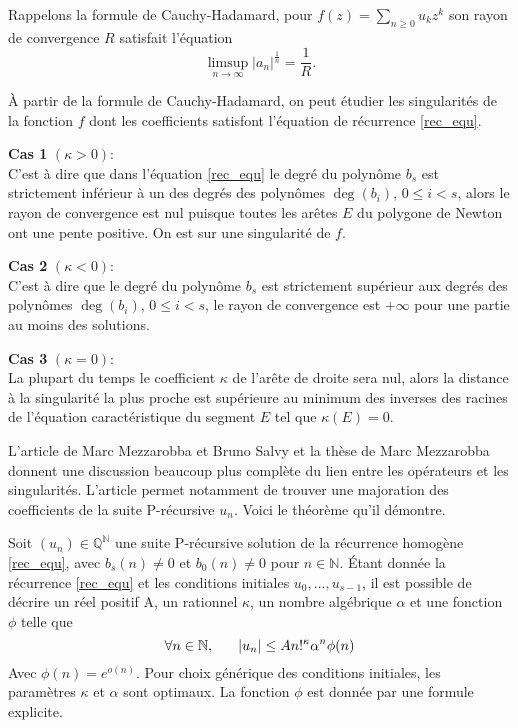 \documentclass[a4paper,10pt]{article}
\begin{document}
	Rappelons la formule de Cauchy-Hadamard, pour $f(z)=\sum_{n\geq0}u_kz^k$ son rayon de convergence $R$ satisfait l'équation
	\begin{equation}
		\limsup_{n\rightarrow \infty}|a_n|^{\frac{1}{n}}=\frac{1}{R}.
		\label{Cauchy_Hadam}
	\end{equation}
	
	À partir de la formule de Cauchy-Hadamard, on peut étudier les singularités de la fonction $f$ dont les coefficients satisfont l'équation de récurrence \eqref{rec_equ}.  
	\vspace{3mm}
	
	\noindent\textbf{Cas 1} $(\kappa>0)$:\\
	C'est à dire que dans l'équation \eqref{rec_equ} le degré du polynôme $b_s$ est strictement inférieur à un des degrés des polynômes $\deg(b_i)$, $0\leq i<s$, alors le rayon de convergence est nul puisque toutes les arêtes $E$ du polygone de Newton ont une pente positive. On est sur une singularité de $f$.
	\vspace{3mm}

	\noindent\textbf{Cas 2} $(\kappa<0)$:\\
	C'est à dire que le degré du polynôme $b_s$ est strictement supérieur aux degrés des polynômes $\deg(b_i)$, $0 \leq i<s$, le rayon de convergence est $+\infty$ pour une partie au moins des solutions.
	\vspace{3mm}
	
	\noindent\textbf{Cas 3} $(\kappa=0)$:\\
 	La plupart du temps le coefficient $\kappa$ de l'arête de droite sera nul, alors la distance à la singularité la plus proche est supérieure au minimum des inverses des racines de l'équation caractéristique du segment $E$ tel que $\kappa(E)=0$.
 	\vspace{3mm}
	
	L'article de Marc Mezzarobba et Bruno Salvy \cite{MezzarobbaSalvy2010} et la thèse de Marc Mezzarobba \cite{Mezzarobba2011} donnent une discussion beaucoup plus complète du lien entre les opérateurs et les singularités. L'article \cite{MezzarobbaSalvy2010} permet notamment de trouver une majoration des coefficients de la suite P-récursive $u_n$. Voici le théorème qu'il démontre.
	
	\begin{theorem}Soit $(u_{n})\in \mathbb{Q}^{\mathbb{N}}$ une suite P-récursive solution de la récurrence homogène \eqref{rec_equ}, avec $b_s(n) \neq 0$ et $b_0(n) \neq 0$ pour $n \in \mathbb{N}$. Étant donnée la récurrence \eqref{rec_equ} et les conditions initiales $u_{0},...,u_{s-1}$, il est possible de décrire un réel positif A, un rationnel $\kappa$, un nombre algébrique $\alpha$  et une fonction $\phi$ telle que
	\[\forall n\in \mathbb{N}, \hspace{6mm}|u_{n}| \leq A n!^{\kappa}\alpha^{n}\phi(n)\]
	Avec $\phi(n)=e^{o(n)}$. Pour choix générique des conditions initiales, les paramètres $\kappa$ et $\alpha$ sont optimaux. La fonction $\phi$ est donnée par une formule explicite.
	\label{Th_maj}
	\end{theorem}
	
\end{document}
